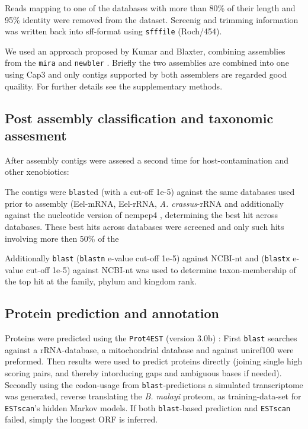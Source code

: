 \documentclass[10pt]{bmc_article}
\newenvironment{bmcformat}{\begin{raggedright}\baselineskip20pt\sloppy\setboolean{publ}{false}}{\end{raggedright}\baselineskip20pt\sloppy}
\begin{document}
\begin{bmcformat}
Reads mapping to one of the databases with more than 80\% of their
length and 95\% identity were removed from the dataset. Screenig and
trimming information was written back into sff-format using
\texttt{sfffile} (Roch/454).

We used an approach proposed by Kumar and Blaxter\cite{pmid20950480},
combining assemblies from the \texttt{mira} \cite{miraEST} and
\texttt{newbler} \cite{pmid16056220}. Briefly the two assemblies are
combined into one using Cap3\cite{Cap3_Huang} and only contigs
supported by both assemblers are regarded good quaility. For further
details see the supplementary methods.

\subsection*{Post assembly classification and taxonomic assesment}

After assembly contigs were assesed a second time for
host-contamination and other xenobiotics:

The contigs were \texttt{blast}ed (with a cut-off 1e-5) against the
same databases used prior to assembly (Eel-mRNA, Eel-rRNA,
\textit{A. crassus}-rRNA and additionally against the nucleotide
version of nempep4 \cite{parkinson_nembase:resource_2004,
  pmid21550347}, determining the best hit across databases. These best
hits across databases were screened and only such hits involving more
then 50\% of the 

Additionally \texttt{blast} (\texttt{blastn} e-value cut-off 1e-5)
against NCBI-nt and (\texttt{blastx} e-value cut-off 1e-5) against
NCBI-nt was used to determine taxon-membership of the top hit at the
family, phylum and kingdom rank.

\subsection*{Protein prediction and annotation}

Proteins were predicted using the \texttt{Prot4EST} (version 3.0b)
\cite{wasmuth_prot4est:_2004}: First \texttt{blast} searches against a
rRNA-database, a mitochondrial database and against
uniref100\cite{pmid18836194} were preformed. Then results were used to
predict proteins directly (joining single high scoring pairs, and
thereby intorducing gaps and ambiguous bases if needed). Secondly
using the codon-usage from \texttt{blast}-predictions a simulated
transcriptome was generated, reverse translating the
\textit{B. malayi} proteom, as training-data-set for
\texttt{ESTscan}’s\cite{estscan} hidden Markov models.  If both
\texttt{blast}-based prediction and \texttt{ESTscan} failed, simply
the longest ORF is inferred.


\end{bmcformat}
\end{document}
